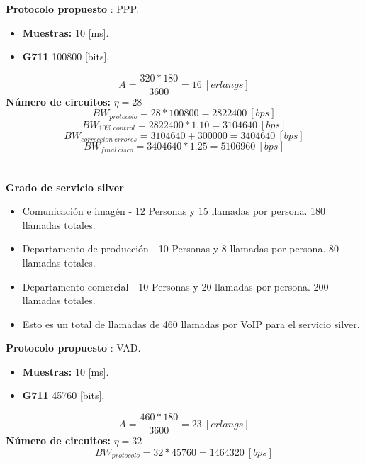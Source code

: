 \documentclass[12pt,letterpaper]{article}
\begin{document}
\textbf{Protocolo propuesto} : PPP.
\begin{itemize}
    \item \textbf{Muestras: }10 [ms].
    \item \textbf{G711} 100800 [bits].
\end{itemize}
\begin{equation}
    A=\frac{320 * 180}{3600}=16 \ [erlangs]
\end{equation}
\textbf{Número de circuitos: } $\eta = 28$
\newline
\begin{equation}
    BW_{protocolo}=28 * 100800 = 2822400 \ [bps]
\end{equation}
\begin{equation}
    BW_{10\% \ control}=2822400*1.10 = 3104640 \ [bps]
\end{equation}
\begin{equation}
    BW_{correccion \ errores}=3104640+300000 = 3404640 \ [bps]
\end{equation}
\begin{equation}
    BW_{final \ cisco}=3404640*1.25 = 5106960 \ [bps]
\end{equation}
\\ \\
\textbf{Grado de servicio silver}
\begin{itemize}
    \item Comunicación e imagén - 12 Personas y 15 llamadas por persona. 180 llamadas totales.
    \item Departamento de producción - 10 Personas y 8 llamadas por persona. 80 llamadas totales.
    \item Departamento comercial - 10 Personas y 20 llamadas por persona. 200 llamadas totales.
    \item Esto es un total de llamadas de 460 llamadas por VoIP para el servicio silver.
\end{itemize}
\textbf{Protocolo propuesto} : VAD.
\begin{itemize}
    \item \textbf{Muestras: }10 [ms].
    \item \textbf{G711} 45760 [bits].
\end{itemize}
\begin{equation}
    A=\frac{460 * 180}{3600}=23 \ [erlangs]
\end{equation}
\textbf{Número de circuitos: } $\eta = 32$
\newline
\begin{equation}
    BW_{protocolo}=32 * 45760 = 1464320 \ [bps]
\end{equation}
\end{document}
